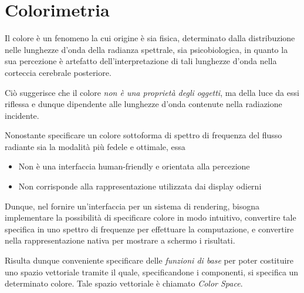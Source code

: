 \section{Colorimetria}\label{chapter2:section:colorimetry}
Il colore \`e un fenomeno la cui origine \`e sia fisica, determinato dalla distribuzione nelle lunghezze d'onda della radianza spettrale, sia 
psicobiologica, in quanto la sua percezione \`e artefatto dell'interpretazione di tali lunghezze d'onda nella corteccia cerebrale posteriore.\par
Ci\`o suggerisce che il colore \textit{non \`e una propriet\`a degli oggetti}, ma della luce da essi riflessa e dunque dipendente alle lunghezze d'onda
contenute nella radiazione incidente.\par
Nonostante specificare un colore sottoforma di spettro di frequenza del flusso radiante sia la modalit\`a pi\`u fedele e ottimale, essa
\begin{itemize}[topsep=0pt, noitemsep]
	\item Non \`e una interfaccia human-friendly e orientata alla percezione
	\item Non corrisponde alla rappresentazione utilizzata dai display odierni
\end{itemize}
Dunque, nel fornire un'interfaccia per un sistema di rendering, bisogna implementare la possibilit\`a di specificare colore in modo intuitivo, 
convertire tale specifica in uno spettro di frequenze per effettuare la computazione, e convertire nella rappresentazione nativa per mostrare a schermo
i risultati.\par
\begin{definitionS}
	Risulta dunque conveniente specificare delle \textit{funzioni di base} per poter costituire uno spazio vettoriale tramite il quale, specificandone
	i componenti, si specifica un determinato colore. Tale spazio vettoriale \`e chiamato \textit{Color Space}.
\end{definitionS}
